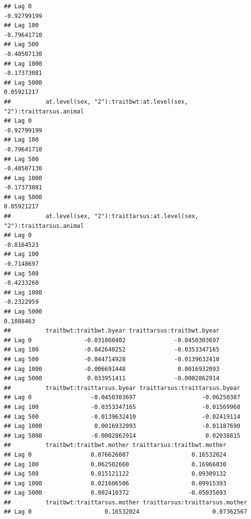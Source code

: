 \documentclass[
  12pt,
]{book}
\begin{document}
\begin{verbatim}
## Lag 0                                                          -0.92799199
## Lag 100                                                        -0.79641710
## Lag 500                                                        -0.40507130
## Lag 1000                                                       -0.17373081
## Lag 5000                                                        0.05921217
##          at.level(sex, "2"):traitbwt:at.level(sex, "2"):traittarsus.animal
## Lag 0                                                          -0.92799199
## Lag 100                                                        -0.79641710
## Lag 500                                                        -0.40507130
## Lag 1000                                                       -0.17373081
## Lag 5000                                                        0.05921217
##          at.level(sex, "2"):traittarsus:at.level(sex, "2"):traittarsus.animal
## Lag 0                                                              -0.8164523
## Lag 100                                                            -0.7148697
## Lag 500                                                            -0.4233260
## Lag 1000                                                           -0.2322959
## Lag 5000                                                            0.1088463
##          traitbwt:traitbwt.byear traittarsus:traitbwt.byear
## Lag 0               -0.031860402              -0.0450303697
## Lag 100             -0.042640252              -0.0353347165
## Lag 500             -0.044714928              -0.0139632410
## Lag 1000            -0.006691448               0.0016932093
## Lag 5000             0.033951411              -0.0002862914
##          traitbwt:traittarsus.byear traittarsus:traittarsus.byear
## Lag 0                 -0.0450303697                   -0.06250387
## Lag 100               -0.0353347165                   -0.01569968
## Lag 500               -0.0139632410                   -0.02419114
## Lag 1000               0.0016932093                   -0.01187690
## Lag 5000              -0.0002862914                    0.02038815
##          traitbwt:traitbwt.mother traittarsus:traitbwt.mother
## Lag 0                 0.076626007                  0.16532024
## Lag 100               0.062502660                  0.16966030
## Lag 500               0.015121122                  0.09309132
## Lag 1000              0.021606506                  0.09915393
## Lag 5000              0.002410372                 -0.05035693
##          traitbwt:traittarsus.mother traittarsus:traittarsus.mother
## Lag 0                     0.16532024                     0.07362567

\end{verbatim}
\end{document}

